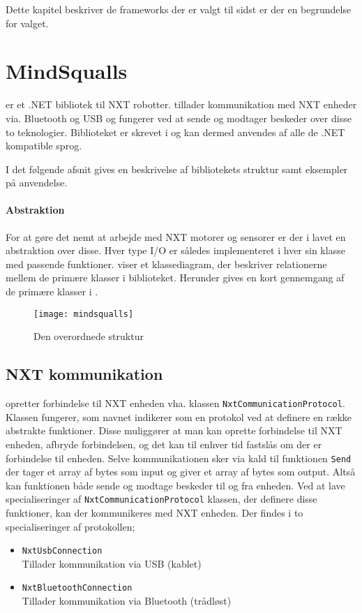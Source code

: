 Dette kapitel beskriver de frameworks der er valgt til sidst er der en begrundelse for valget.
\section{MindSqualls}\label{mindsqualls}
\mindsqualls er et .NET bibliotek til \legos NXT robotter.
\mindsqualls tillader kommunikation med NXT enheder via. Bluetooth og USB og fungerer ved at sende og modtager beskeder over disse to teknologier.
Biblioteket er skrevet i \csharp og kan dermed anvendes af alle de .NET kompatible sprog.

I det følgende afsnit gives en beskrivelse af bibliotekets struktur samt eksempler på anvendelse.

\paragraph{Abstraktion}
For at gøre det nemt at arbejde med NXT motorer og sensorer er der i \mindsqualls lavet en abstraktion over disse.
Hver type I/O er således implementeret i hver sin klasse med passende funktioner.
 viser et klassediagram, der beskriver relationerne mellem de primære klasser i \mindsqualls biblioteket.
Herunder gives en kort gennemgang af de primære klasser i \mindsqualls.

\begin{figure}
\centering
\texttt{[image: mindsqualls]}
\caption{Den overordnede \mindsqualls struktur}
\label{mindsqualls:structure}
\end{figure}

\subsection{NXT kommunikation}
\mindsqualls opretter forbindelse til NXT enheden vha. klassen \lstinline[style=csharp]!NxtCommunicationProtocol!.
Klassen fungerer, som navnet indikerer som en protokol ved at definere en række abstrakte funktioner.
Disse muliggører at man kan oprette forbindelse til NXT enheden, afbryde forbindelsen, og det kan til enhver tid fastslås om der er forbindelse til enheden.
Selve kommunikationen sker via kald til funktionen \lstinline[style=csharp]!Send! der tager et array af bytes som input og giver et array af bytes som output.
Altså kan funktionen både sende og modtage beskeder til og fra enheden.
Ved at lave specialiseringer af \lstinline[style=csharp]!NxtCommunicationProtocol! klassen, der definere disse funktioner, kan der kommunikeres med NXT enheden.
Der findes i \mindsqualls to specialiseringer af protokollen;
\begin{itemize}
\item \lstinline[style=csharp]!NxtUsbConnection!\\
Tillader kommunikation via USB (kablet)
\item \lstinline[style=csharp]!NxtBluetoothConnection!\\
Tillader kommunikation via Bluetooth (trådløst)
\end{itemize}

